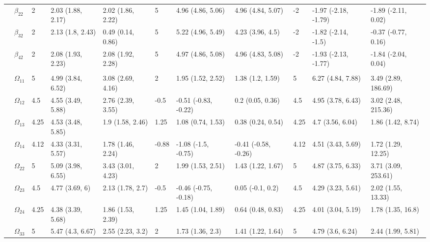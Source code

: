 \documentclass[]{article}
\begin{document}
\begin{landscape}
\begin{table}[t]
\begin{tabular}{lllllllllll}
\hspace{1em} & $\beta_{22}$ & 2 & 2.03 (1.88, 2.17) & 2.02 (1.86, 2.22) & 5 & 4.96 (4.86, 5.06) & 4.96 (4.84, 5.07) & -2 & -1.97 (-2.18, -1.79) & -1.89 (-2.11, 0.02)\\
\hspace{1em} & $\beta_{32}$ & 2 & 2.13 (1.8, 2.43) & 0.49 (0.14, 0.86) & 5 & 5.22 (4.96, 5.49) & 4.23 (3.96, 4.5) & -2 & -1.82 (-2.14, -1.5) & -0.37 (-0.77, 0.16)\\
\hspace{1em} & $\beta_{42}$ & 2 & 2.08 (1.93, 2.23) & 2.08 (1.92, 2.28) & 5 & 4.97 (4.86, 5.08) & 4.96 (4.83, 5.08) & -2 & -1.93 (-2.13, -1.77) & -1.84 (-2.04, 0.04)\\
\addlinespace[0.3em]
\multicolumn{11}{l}{\textbf{ }}\\
\hspace{1em} & $\Omega_{11}$ & 5 & 4.99 (3.84, 6.52) & 3.08 (2.69, 4.16) & 2 & 1.95 (1.52, 2.52) & 1.38 (1.2, 1.59) & 5 & 6.27 (4.84, 7.88) & 3.49 (2.89, 186.69)\\
\hspace{1em} & $\Omega_{12}$ & 4.5 & 4.55 (3.49, 5.88) & 2.76 (2.39, 3.55) & -0.5 & -0.51 (-0.83, -0.22) & 0.2 (0.05, 0.36) & 4.5 & 4.95 (3.78, 6.43) & 3.02 (2.48, 215.36)\\
\hspace{1em} & $\Omega_{13}$ & 4.25 & 4.53 (3.48, 5.85) & 1.9 (1.58, 2.46) & 1.25 & 1.08 (0.74, 1.53) & 0.38 (0.24, 0.54) & 4.25 & 4.7 (3.56, 6.04) & 1.86 (1.42, 8.74)\\
\hspace{1em} & $\Omega_{14}$ & 4.12 & 4.33 (3.31, 5.57) & 1.78 (1.46, 2.24) & -0.88 & -1.08 (-1.5, -0.75) & -0.41 (-0.58, -0.26) & 4.12 & 4.51 (3.43, 5.69) & 1.72 (1.29, 12.25)\\
\hspace{1em} & $\Omega_{22}$ & 5 & 5.09 (3.98, 6.55) & 3.43 (3.01, 4.23) & 2 & 1.99 (1.53, 2.51) & 1.43 (1.22, 1.67) & 5 & 4.87 (3.75, 6.33) & 3.71 (3.09, 253.61)\\
\hspace{1em} & $\Omega_{23}$ & 4.5 & 4.77 (3.69, 6) & 2.13 (1.78, 2.7) & -0.5 & -0.46 (-0.75, -0.18) & 0.05 (-0.1, 0.2) & 4.5 & 4.29 (3.23, 5.61) & 2.02 (1.55, 13.33)\\
\hspace{1em} & $\Omega_{24}$ & 4.25 & 4.38 (3.39, 5.68) & 1.86 (1.53, 2.39) & 1.25 & 1.45 (1.04, 1.89) & 0.64 (0.48, 0.83) & 4.25 & 4.01 (3.04, 5.19) & 1.78 (1.35, 16.8)\\
\hspace{1em} & $\Omega_{33}$ & 5 & 5.47 (4.3, 6.67) & 2.55 (2.23, 3.2) & 2 & 1.73 (1.36, 2.3) & 1.41 (1.22, 1.64) & 5 & 4.79 (3.6, 6.24) & 2.44 (1.99, 5.81)\\

\end{tabular}
\end{table}
\end{landscape}
\end{document}

